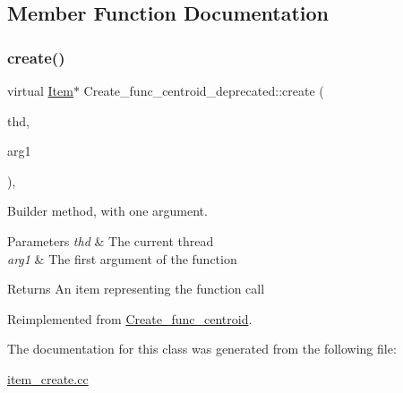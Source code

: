 \subsection{Member Function Documentation}
\mbox{\label{classCreate__func__centroid__deprecated_aceb672ea4e46c9730c4714c804333d5b}} 
\subsubsection{\texorpdfstring{create()}{create()}}
{\footnotesize\ttfamily virtual \mbox{\hyperlink{classItem}{Item}}$\ast$ Create\+\_\+func\+\_\+centroid\+\_\+deprecated\+::create (\begin{DoxyParamCaption}\item[{T\+HD $\ast$}]{thd,  }\item[{\mbox{\hyperlink{classItem}{Item}} $\ast$}]{arg1 }\end{DoxyParamCaption})\hspace{0.3cm}{\ttfamily [inline]}, {\ttfamily [virtual]}}

Builder method, with one argument. 
\begin{DoxyParams}{Parameters}
{\em thd} & The current thread \\
\hline
{\em arg1} & The first argument of the function \\
\hline
\end{DoxyParams}
\begin{DoxyReturn}{Returns}
An item representing the function call 
\end{DoxyReturn}


Reimplemented from \mbox{\hyperlink{classCreate__func__centroid_aef4565161680a1ea2f730eb9a7a5ab3b}{Create\+\_\+func\+\_\+centroid}}.



The documentation for this class was generated from the following file\+:\begin{DoxyCompactItemize}
\item 
\mbox{\hyperlink{item__create_8cc}{item\+\_\+create.\+cc}}\end{DoxyCompactItemize}
